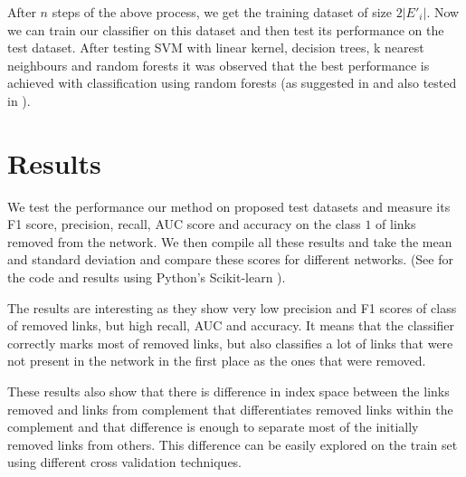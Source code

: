 \documentclass{llncs}
\begin{document}
After $n$ steps of the above process, we get the training dataset of size $2 |E'_i|$. Now we can train our classifier on this dataset and then test its performance on the test dataset. After testing SVM with linear kernel, decision trees, k nearest neighbours and random forests it was observed that the best performance is achieved with classification using random forests (as suggested in \cite{features-for-sl} and also tested in \cite{ipynb-sl}).
%
\section{Results}
%
We test the performance our method on proposed test datasets and measure its F1 score, precision, recall, AUC score and accuracy on the class $1$ of links removed from the network. We then compile all these results and take the mean and standard deviation and compare these scores for different networks. (See \cite{ipynb-sl} for the code and results using Python's Scikit-learn \cite{scikit}).

The results are interesting as they show very low precision and F1 scores of class of removed links, but high recall, AUC and accuracy. It means that the classifier correctly marks most of removed links, but also classifies a lot of links that were not present in the network in the first place as the ones that were removed.

These results also show that there is difference in index space between the links removed and links from complement that differentiates removed links within the complement and that difference is enough to separate most of the initially removed links from others. This difference can be easily explored on the train set using different cross validation techniques.
\end{document}
